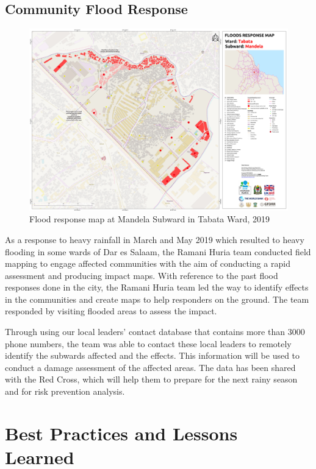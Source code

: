 \documentclass[a4paper,12pt,twoside]{article}
\begin{document}
\subsection{Community Flood Response}

\begin{figure}[h]
    \centering
    \includegraphics[width=.9\textwidth]{images/mandelaexample.PNG}
    \caption{Flood response map at Mandela Subward in Tabata Ward, 2019}
\end{figure}
\begin{multicols}{2}

As a response to heavy rainfall in March and May 2019 which resulted to heavy flooding in some wards of Dar es Salaam, the Ramani Huria team conducted field mapping to engage affected communities with the aim of conducting a rapid assessment and producing impact maps. With reference to the past flood responses done in the city, the Ramani Huria team led the way to identify effects in the communities and create maps to help responders on the ground. The team responded by visiting flooded areas to assess the impact.

Through using our local leaders’ contact database that contains more than 3000 phone numbers, the team was able to contact these local leaders to remotely identify the subwards affected and the effects.
This information will be used to conduct a damage assessment of the affected areas. The data has been shared with the Red Cross, which will help them to prepare for the next rainy season and for risk prevention analysis.
\end{multicols}

\newpage
\section{Best Practices and Lessons Learned}
\end{document}
